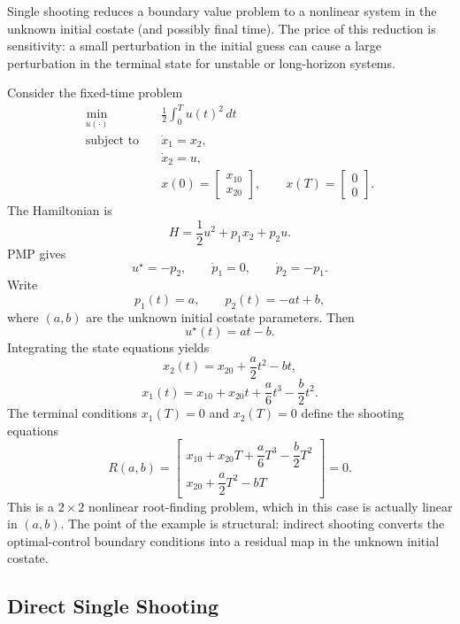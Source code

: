 \begin{remark}
	Single shooting reduces a boundary value problem to a nonlinear system in the unknown initial costate (and possibly final time). The price of this reduction is sensitivity: a small perturbation in the initial guess can cause a large perturbation in the terminal state for unstable or long-horizon systems.
\end{remark}

\begin{eg}
	Consider the fixed-time problem
	\begin{align*}
		\min_{u(\cdot)} \quad & \frac{1}{2}\int_0^T u(t)^2\,dt \\
		\text{subject to}\quad & \dot x_1=x_2, \\
		                       & \dot x_2=u, \\
		                       & x(0)=\begin{bmatrix}x_{10} \\ x_{20}\end{bmatrix},
		\qquad
		x(T)=\begin{bmatrix}0 \\ 0\end{bmatrix}.
	\end{align*}
	The Hamiltonian is
	\[
		H=\frac{1}{2}u^2+p_1x_2+p_2u.
	\]
	PMP gives
	\[
		u^\star=-p_2,
		\qquad
		\dot p_1=0,
		\qquad
		\dot p_2=-p_1.
	\]
	Write
	\[
		p_1(t)=a,
		\qquad
		p_2(t)=-at+b,
	\]
	where $(a,b)$ are the unknown initial costate parameters. Then
	\[
		u^\star(t)=at-b.
	\]
	Integrating the state equations yields
	\[
		x_2(t)=x_{20}+\frac{a}{2}t^2-bt,
	\]
	\[
		x_1(t)=x_{10}+x_{20}t+\frac{a}{6}t^3-\frac{b}{2}t^2.
	\]
	The terminal conditions $x_1(T)=0$ and $x_2(T)=0$ define the shooting equations
	\[
		R(a,b)=
		\begin{bmatrix}
			x_{10}+x_{20}T+\dfrac{a}{6}T^3-\dfrac{b}{2}T^2 \\
			x_{20}+\dfrac{a}{2}T^2-bT
		\end{bmatrix}
		=
		0.
	\]
	This is a $2\times 2$ nonlinear root-finding problem, which in this case is actually linear in $(a,b)$. The point of the example is structural: indirect shooting converts the optimal-control boundary conditions into a residual map in the unknown initial costate.
\end{eg}

\subsection{Direct Single Shooting}
\label{sec:l5-direct-single-shooting}

